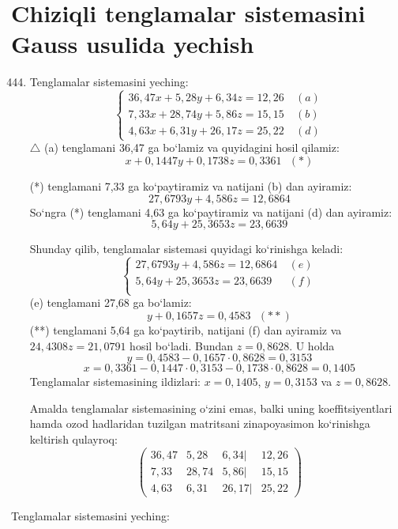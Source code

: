 \section{Chiziqli tenglamalar sistemasini Gauss usulida yechish}


\begin{enumerate}\setcounter{enumi}{443}
	\item Tenglamalar sistemasini yeching:
	$$\begin{cases}
		36,47x+5,28y+6,34z=12,26&\ (a)\\
		7,33x+28,74y+5,86z=15,15&\ (b)\\
		4,63x+6,31y+26,17z=25,22&\ (d)
	\end{cases}$$
$\triangle$ (a) tenglamani 36,47 ga bo`lamiz va quyidagini hosil qilamiz:
$$x+0,1447y+0,1738z=0,3361\ \ \ (*)$$

(*) tenglamani 7,33 ga ko`paytiramiz va natijani (b) dan ayiramiz:
$$27,6793y+4,586z=12,6864$$ 
So`ngra (*) tenglamani 4,63 ga ko`paytiramiz va natijani (d) dan ayiramiz:
$$5,64y+25,3653z=23,6639$$

Shunday qilib, tenglamalar sistemasi quyidagi ko`rinishga keladi:
$$\begin{cases}
	27,6793y+4,586z=12,6864&\ (e)\\
	5,64y+25,3653z=23,6639&\ (f)\\
\end{cases}$$
(e) tenglamani 27,68 ga bo`lamiz:
$$y+0,1657z=0,4583\ \ \ (**)$$
(**) tenglamani 5,64 ga ko`paytirib, natijani (f) dan ayiramiz va $24,4308z=21,0791$ hosil bo`ladi. Bundan $z=0,8628$. U holda 
$$y=0,4583-0,1657\cdot0,8628=0,3153$$
$$x=0,3361-0,1447\cdot0,3153-0,1738\cdot0,8628=0,1405$$
Tenglamalar sistemasining ildizlari: $x=0,1405$, $y=0,3153$ va $z=0,8628$. 

Amalda tenglamalar sistemasining o`zini emas, balki uning koeffitsiyentlari hamda ozod hadlaridan tuzilgan matritsani zinapoyasimon ko`rinishga keltirish qulayroq:
$$\begin{pmatrix}
36,47&5,28&6,34|&12,26\\
7,33&28,74&5,86|&15,15\\
4,63&6,31&26,17|&25,22
\end{pmatrix}
$$
\end{enumerate}
Tenglamalar sistemasini yeching:
